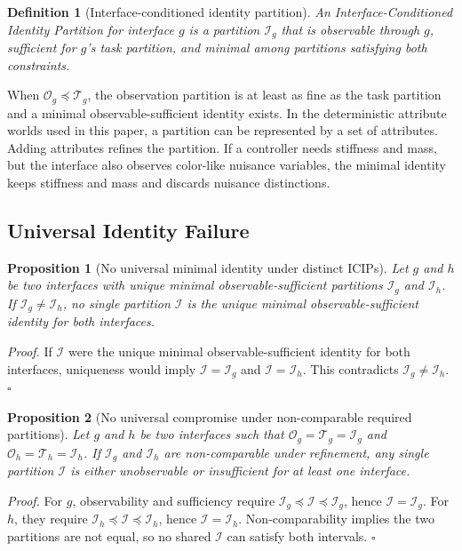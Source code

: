 \documentclass{article}
\newtheorem{proposition}{Proposition}
\newtheorem{definition}{Definition}
\newcommand{\icip}{\textsc{ICIP}}
\newcommand{\obs}{\mathcal{O}}
\newcommand{\task}{\mathcal{T}}
\newcommand{\ident}{\mathcal{I}}
\begin{document}
\begin{definition}[Interface-conditioned identity partition]
An Interface-Conditioned Identity Partition for interface $g$ is a partition $\ident_g$ that is observable through $g$, sufficient for $g$'s task partition, and minimal among partitions satisfying both constraints.
\end{definition}

When $\obs_g \preceq \task_g$, the observation partition is at least as fine as the task partition and a minimal observable-sufficient identity exists.
In the deterministic attribute worlds used in this paper, a partition can be represented by a set of attributes.
Adding attributes refines the partition.
If a controller needs stiffness and mass, but the interface also observes color-like nuisance variables, the minimal identity keeps stiffness and mass and discards nuisance distinctions.

\subsection{Universal Identity Failure}

\begin{proposition}[No universal minimal identity under distinct \icip{}s]
Let $g$ and $h$ be two interfaces with unique minimal observable-sufficient partitions $\ident_g$ and $\ident_h$.
If $\ident_g \neq \ident_h$, no single partition $\ident$ is the unique minimal observable-sufficient identity for both interfaces.
\end{proposition}

\textit{Proof.}
If $\ident$ were the unique minimal observable-sufficient identity for both interfaces, uniqueness would imply $\ident=\ident_g$ and $\ident=\ident_h$.
This contradicts $\ident_g\neq\ident_h$.
\hfill $\square$

\begin{proposition}[No universal compromise under non-comparable required partitions]
Let $g$ and $h$ be two interfaces such that $\obs_g=\task_g=\ident_g$ and $\obs_h=\task_h=\ident_h$.
If $\ident_g$ and $\ident_h$ are non-comparable under refinement, any single partition $\ident$ is either unobservable or insufficient for at least one interface.
\end{proposition}

\textit{Proof.}
For $g$, observability and sufficiency require $\ident_g \preceq \ident \preceq \ident_g$, hence $\ident=\ident_g$.
For $h$, they require $\ident_h \preceq \ident \preceq \ident_h$, hence $\ident=\ident_h$.
Non-comparability implies the two partitions are not equal, so no shared $\ident$ can satisfy both intervals.
\hfill $\square$
\end{document}
